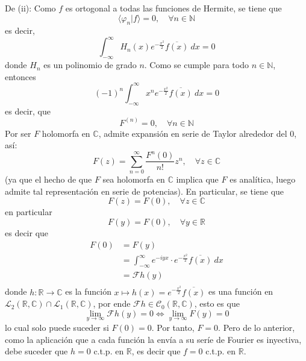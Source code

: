 \documentclass[12pt]{report}
\theoremstyle{largebreak}
\newcommand\cf[3]{\ensuremath{#1:#2\rightarrow#3}}
\newcommand\pint[2]{\ensuremath{\langle#1| #2\rangle}}
\newcommand\conj[1]{\ensuremath{\overline{#1}}}
\newcommand{\fou}[1]{\ensuremath{\mathcal{F}#1}}
\begin{document}
\begin{sol}
        De (ii): Como $f$ es ortogonal a todas las funciones de Hermite, se tiene que
        \begin{equation*}
            \pint{\varphi_n}{f}=0,\quad\forall n\in\mathbb{N}
        \end{equation*}
        es decir,
        \begin{equation*}
            \int_{ -\infty}^{\infty}H_n(x)e^{ -\frac{x^2}{2}}\conj{f(x)}\:dx=0
        \end{equation*}
        donde $H_n$ es un polinomio de grado $n$. Como se cumple para todo $n\in\mathbb{N}$, entonces
        \begin{equation*}
            (-1)^n\int_{ -\infty}^{\infty}x^n e^{ -\frac{x^2}{2}}\conj{f(x)}\:dx=0
        \end{equation*}
        es decir, que
        \begin{equation*}
            F^(n)=0,\quad\forall n\in\mathbb{N}
        \end{equation*}
        Por ser $F$ holomorfa en $\mathbb{C}$, admite expansión en serie de Taylor alrededor del 0, así:
        \begin{equation*}
            F(z)=\sum_{ n=0}^\infty \frac{F^{n}(0)}{n!}z^n,\quad\forall z\in\mathbb{C}
        \end{equation*}
        (ya que el hecho de que $F$ sea holomorfa en $\mathbb{C}$ implica que $F$ es analítica, luego admite tal representación en serie de potencias). En particular, se tiene que
        \begin{equation*}
            F(z)=F(0),\quad\forall z\in\mathbb{C}
        \end{equation*}
        en particular
        \begin{equation*}
            F(y)=F(0),\quad\forall y\in\mathbb{R}
        \end{equation*}
        es decir que
        \begin{equation*}
            \begin{split}
                F(0)&=F(y)\\
                &=\int_{ -\infty}^{\infty}e^{ -iyx}\cdot e^{-\frac{x^2}{2}}\conj{f(x)}\:dx\\
                &=\fou{h}(y)\\
            \end{split}
        \end{equation*}
        donde $\cf{h}{\mathbb{R}}{\mathbb{C}}$ es la función $x\mapsto h(x)=e^{-\frac{x^2}{2}}\conj{f(x)}$ es una función en $\mathcal{L}_2(\mathbb{R},\mathbb{C})\cap\mathcal{L}_1(\mathbb{R},\mathbb{C})$, por ende $\fou{h}\in\mathcal{C}_0(\mathbb{R},\mathbb{C})$, esto es que
        \begin{equation*}
            \lim_{ y\rightarrow\infty}\fou{h}(y)=0\iff\lim_{ y\rightarrow\infty}F(y)=0
        \end{equation*}
        lo cual solo puede suceder si $F(0)=0$. Por tanto, $F=0$. Pero de lo anterior, como la aplicación que a cada función la envía a su seríe de Fourier es inyectiva, debe suceder que $h=0$ c.t.p. en $\mathbb{R}$, es decir que $f=0$ c.t.p. en $\mathbb{R}$.
    \end{sol}
\end{document}
